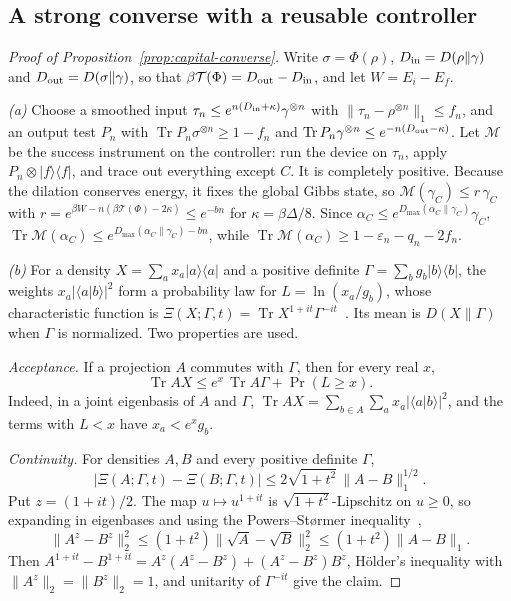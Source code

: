 \documentclass[11pt]{article}
\theoremstyle{definition}
\theoremstyle{remark}
\newcommand{\Tr}{\operatorname{Tr}}
\begin{document}
\subsection{A strong converse with a reusable controller}\label{pf:capital}

\begin{proof}[Proof of Proposition~\ref{prop:capital-converse}]
Write $\sigma=\Phi(\rho)$, $D_{\rm in}=D(\rho\|\gamma)$ and $D_{\rm out}=D(\sigma\|\gamma)$, so that $\beta\mathcal T(\Phi)=D_{\rm out}-D_{\rm in}$, and let $W=E_i-E_f$.

\emph{(a)} Choose a smoothed input $\tau_n\le e^{n(D_{\rm in}+\kappa)}\gamma^{\otimes n}$ with $\|\tau_n-\rho^{\otimes n}\|_1\le f_n$, and an output test $P_n$ with $\Tr P_n\sigma^{\otimes n}\ge1-f_n$ and $\Tr P_n\gamma^{\otimes n}\le e^{-n(D_{\rm out}-\kappa)}$. Let $\mathcal M$ be the success instrument on the controller: run the device on $\tau_n$, apply $P_n\otimes|f\rangle\langle f|$, and trace out everything except $C$. It is completely positive. Because the dilation conserves energy, it fixes the global Gibbs state, so $\mathcal M(\gamma_C)\le r\,\gamma_C$ with $r=e^{\beta W-n(\beta\mathcal T(\Phi)-2\kappa)}\le e^{-bn}$ for $\kappa=\beta\Delta/8$. Since $\alpha_C\le e^{D_{\max}(\alpha_C\|\gamma_C)}\gamma_C$, $\Tr\mathcal M(\alpha_C)\le e^{D_{\max}(\alpha_C\|\gamma_C)-bn}$, while $\Tr\mathcal M(\alpha_C)\ge1-\varepsilon_n-q_n-2f_n$.

\emph{(b)} For a density $X=\sum_ax_a|a\rangle\langle a|$ and a positive definite $\Gamma=\sum_bg_b|b\rangle\langle b|$, the weights $x_a|\langle a|b\rangle|^2$ form a probability law for $L=\ln(x_a/g_b)$, whose characteristic function is $\Xi(X;\Gamma,t)=\Tr X^{1+it}\Gamma^{-it}$~\cite{NussbaumSzkola09}. Its mean is $D(X\|\Gamma)$ when $\Gamma$ is normalized. Two properties are used.

\emph{Acceptance.} If a projection $A$ commutes with $\Gamma$, then for every real $x$,
\begin{equation}\label{eq:accept}
\Tr AX\le e^x\,\Tr A\Gamma+\Pr(L\ge x).
\end{equation}
Indeed, in a joint eigenbasis of $A$ and $\Gamma$, $\Tr AX=\sum_{b\in A}\sum_ax_a|\langle a|b\rangle|^2$, and the terms with $L<x$ have $x_a<e^xg_b$.

\emph{Continuity.} For densities $A,B$ and every positive definite $\Gamma$,
\[
|\Xi(A;\Gamma,t)-\Xi(B;\Gamma,t)|\le2\sqrt{1+t^2}\,\|A-B\|_1^{1/2}.
\]
Put $z=(1+it)/2$. The map $u\mapsto u^{1+it}$ is $\sqrt{1+t^2}$-Lipschitz on $u\ge0$, so expanding in eigenbases and using the Powers--St{\o}rmer inequality~\cite{PowersStormer70},
\[
\|A^z-B^z\|_2^2\le(1+t^2)\|\sqrt A-\sqrt B\|_2^2\le(1+t^2)\|A-B\|_1.
\] Then $A^{1+it}-B^{1+it}=A^z(A^z-B^z)+(A^z-B^z)B^z$, H\"older's inequality with $\|A^z\|_2=\|B^z\|_2=1$, and unitarity of $\Gamma^{-it}$ give the claim.


\end{proof}
\end{document}
